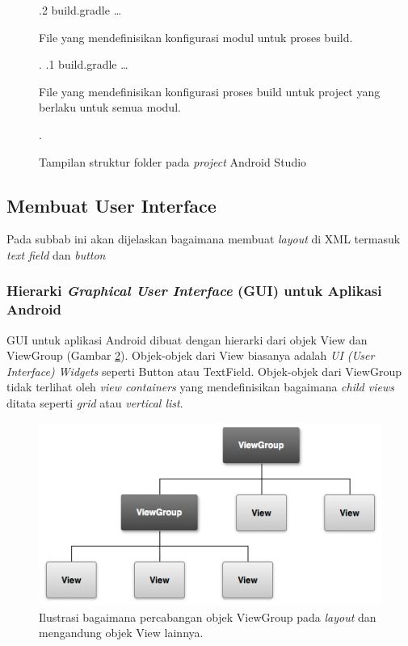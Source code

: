 \begin{figure}[htbp]
{					.2 {build.gradle} \ldots{} \begin{minipage}[t]{5cm}File yang mendefinisikan konfigurasi modul untuk proses build{.}\end{minipage}.
					.1 {build.gradle} \ldots{} \begin{minipage}[t]{5cm}File yang mendefinisikan konfigurasi proses build untuk project yang berlaku untuk semua modul{.}\end{minipage}.
				}
				\caption{Tampilan struktur folder pada \textit{project} Android Studio}
				\label{fig:android-studio-structure}
				\end{figure}
\subsection{Membuat User Interface}

Pada subbab ini akan dijelaskan bagaimana membuat \textit{layout} di XML termasuk \textit{text field} dan \textit{button}\cite{android_developers}

\subsubsection{Hierarki \textit{Graphical User Interface} (GUI) untuk Aplikasi Android}
\label{sssec:hierarki_gui_untuk_aplikasi_android}
GUI untuk aplikasi Android dibuat dengan hierarki dari objek View dan ViewGroup (Gambar \ref{fig:viewgroup}). Objek-objek dari View biasanya adalah \textit{UI (User Interface) Widgets} seperti Button atau TextField. Objek-objek dari ViewGroup tidak terlihat oleh \textit{view containers} yang mendefinisikan bagaimana \textit{child views} ditata seperti \textit{grid} atau \textit{vertical list}.

\begin{figure}[htbp]
	\centering
		\includegraphics[scale=1]{Gambar/viewgroup.png}
	\caption{Ilustrasi bagaimana percabangan objek ViewGroup pada \textit{layout} dan mengandung objek View lainnya.}
	\label{fig:viewgroup}
\end{figure}

